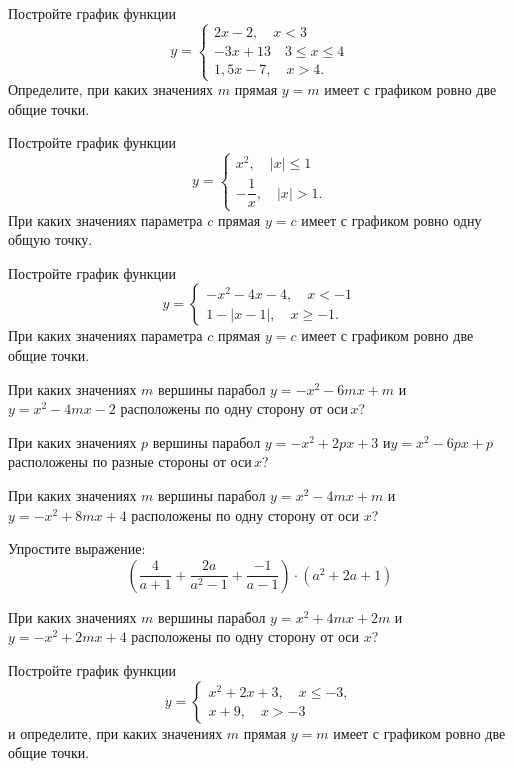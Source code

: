 \begin{class}[number=4]
	\begin{listofex}
		\item Постройте график функции
		\[y=	 \left\{
		\begin{array}{l}
			2x-2, \quad x<3\\
			-3x+13 \quad 3\leq x\leq4\\
			1,5x-7, \quad x>4.
		\end{array}
		\right. \]
		Определите, при каких значениях \( m \) прямая \( y=m \) имеет с графиком ровно две общие точки.
		\item Постройте график функции
		\[y=	 \left\{
		\begin{array}{l}
			x^2, \quad |x|\leq1\\
			-\dfrac{1}{x}, \quad |x|>1.
		\end{array}
		\right. \]
		При каких значениях параметра \( c \) прямая \( y=c \) имеет с графиком ровно одну общую точку.
		\item Постройте график функции
		\[y=	 \left\{
		\begin{array}{l}
			-x^2-4x-4, \quad x<-1\\
			1-|x-1|, \quad x\geq-1.
		\end{array}
		\right. \]
		При каких значениях параметра \( c \) прямая \( y=c \) имеет с графиком ровно две общие точки.
		\item При каких значениях \( m \) вершины парабол \( y =-x^2-6mx+m \) и \( y= x^2-4mx-2 \) расположены по одну сторону от оси \( x \)?		
		\item При каких значениях \( p \) вершины парабол \( y= -x^2+2px+3 \) и\( y= x^2-6px+p \) расположены по разные стороны от оси \( x \)?
		\item При каких значениях \( m \) вершины парабол \( y= x^2-4mx+m \) и \(y=-x^2+8mx+4 \) расположены по одну сторону от оси \( x \)?
	\end{listofex}
\end{class}

\begin{homework}[number=2]
	\begin{listofex}
		\item Упростите выражение: \[ \left( \dfrac{4}{a+1}+\dfrac{2a}{a^2-1}+\dfrac{-1}{a-1} \right)\cdot(a^2+2a+1) \]
		\item При каких значениях \( m \) вершины парабол \( y=x^2+4mx+2m \) и \( y=-x^2+2mx+4 \) расположены по одну сторону от оси \( x \)?
		\item Постройте график функции
		\[y=	 \left\{
		\begin{array}{l}
			x^2+2x+3, \quad x\leq-3,\\
			x+9, \quad x>-3
		\end{array}
		\right. \]
		и определите, при каких значениях \( m \) прямая \( y=m \) имеет с графиком ровно две общие точки.
	\end{listofex}
\end{homework}

